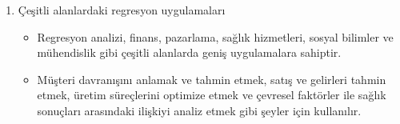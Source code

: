 \documentclass{article}
\begin{document}
\begin{enumerate}[label=\alph*)]
\item Çeşitli alanlardaki regresyon uygulamaları
\begin{itemize}
\item Regresyon analizi, finans, pazarlama, sağlık hizmetleri, sosyal bilimler ve mühendislik gibi çeşitli alanlarda geniş uygulamalara sahiptir.
\item Müşteri davranışını anlamak ve tahmin etmek, satış ve gelirleri tahmin etmek, üretim süreçlerini optimize etmek ve çevresel faktörler ile sağlık sonuçları arasındaki ilişkiyi analiz etmek gibi şeyler için kullanılır.
\end{itemize}
\end{enumerate}
\end{document}

